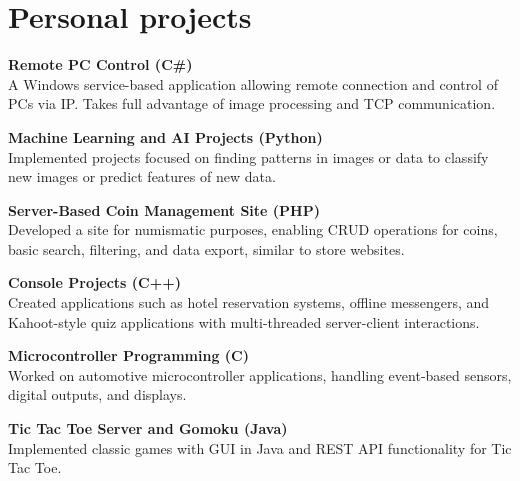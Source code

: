 \documentclass[a4paper,10pt]{article}
\begin{document}
\vspace{1em}

\section*{Personal projects}
\textbf{Remote PC Control (C\#)} \\
A Windows service-based application allowing remote connection and control of PCs via IP.  Takes full advantage of image processing and TCP communication.

\textbf{Machine Learning and AI Projects (Python)} \\
Implemented projects focused on finding patterns in images or data to classify new images or predict features of new data.

\textbf{Server-Based Coin Management Site (PHP)} \\
Developed a site for numismatic purposes, enabling CRUD operations for coins, basic search, filtering, and data export, similar to store websites.

\textbf{Console Projects (C++)} \\
Created applications such as hotel reservation systems, offline messengers, and Kahoot-style quiz applications with multi-threaded server-client interactions.

\textbf{Microcontroller Programming (C)} \\
Worked on automotive microcontroller applications, handling event-based sensors, digital outputs, and displays.

\textbf{Tic Tac Toe Server and Gomoku (Java)} \\
Implemented classic games with GUI in Java and REST API functionality for Tic Tac Toe.
\end{document}
